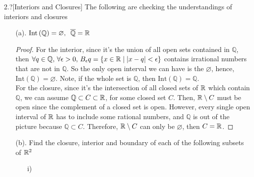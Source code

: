 \begin{cusques}{2.?}[Interiors and Closures] The following are checking the understandings of interiors and closures
\begin{enumerate}
    \item[(a).] $\text{Int} \left(\mathbb{Q}\right) = \varnothing, \,\,\, \overline{\mathbb{Q}} = \mathbb{R}$
    \begin{proof}
    For the interior, since it's the union of all open sets contained in $\mathbb{Q}$, then $\forall q \in \mathbb{Q}, \, \forall \epsilon > 0, \, B_{\epsilon}q = \left\{x \in \mathbb{R} \mid |x - q| < \epsilon\right\}$ contains irrational numbers that are not in $\mathbb{Q}$. So the only open interval we can have is the $\varnothing$, hence, $\text{Int} \left(\mathbb{Q}\right) = \varnothing$. Note, if the whole set is $\mathbb{Q}$, then $\text{Int} \left(\mathbb{Q}\right) = \mathbb{Q}$.\\
    For the closure, since it's the intersection of all closed sets of $\mathbb{R}$ which contain $\mathbb{Q}$, we can assume $\mathbb{Q} \subset C \subset \mathbb{R}$, for some closed set $C$. Then, $\mathbb{R} \setminus C$ must be open since the complement of a closed set is open. However, every single open interval of $\mathbb{R}$ has to include some rational numbers, and $\mathbb{Q}$ is out of the picture because $\mathbb{Q} \subset C$. Therefore, $\mathbb{R} \setminus C$ can only be $\varnothing$, then $C = \mathbb{R}$.
    \end{proof}
    \item[(b).] Find the closure, interior and boundary of each of the following subsets of $\mathbb{R}^2$
        \begin{enumerate}
            \item[i)] 
        \end{enumerate}
\end{enumerate}
\end{cusques}

